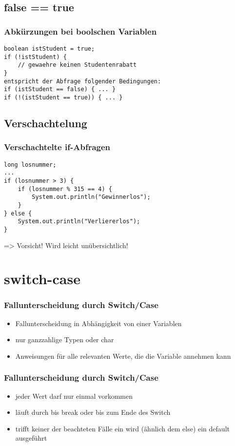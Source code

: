 \documentclass[final]{beamer}
\begin{document}
\subsection{false == true}
\begin{frame}[containsverbatim]
	\frametitle{Abkürzungen bei boolschen Variablen}
	\begin{lstlisting}
boolean istStudent = true;
if (!istStudent) {
	// gewaehre keinen Studentenrabatt
}
entspricht der Abfrage folgender Bedingungen:
if (istStudent == false) { ... }
if (!(istStudent == true)) { ... }

	\end{lstlisting}
\end{frame}

\subsection{Verschachtelung}
\begin{frame}[containsverbatim]
	\frametitle{Verschachtelte if-Abfragen}
	\begin{lstlisting}
long losnummer;
...
if (losnummer > 3) {
	if (losnummer % 315 == 4) {
		System.out.println("Gewinnerlos");
	}
} else {
	System.out.println("Verliererlos");
}
	\end{lstlisting}
	=> Vorsicht! Wird leicht unübersichtlich!
\end{frame}

\section{switch-case}
\begin{frame}[containsverbatim]
	\frametitle{Fallunterscheidung durch Switch/Case}
	\begin{itemize}
		\item{Fallunterscheidung in Abhängigkeit von einer Variablen}
		\item{nur ganzzahlige Typen oder char}
		\item{Anweisungen für alle relevanten Werte, die die Variable annehmen kann}
	\end{itemize}
\end{frame}

\begin{frame}[containsverbatim]
  \frametitle{Fallunterscheidung durch Switch/Case}
  \begin{itemize}
	\item{jeder Wert darf nur einmal vorkommen}
	\item{läuft durch bis break oder bis zum Ende des Switch}
	\item{trifft keiner der beachteten Fälle ein wird (ähnlich dem else) ein default ausgeführt}
  \end{itemize}
\end{frame}
\end{document}
